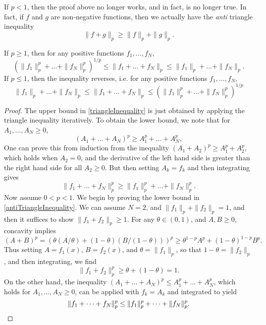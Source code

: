 \begin{remark}
  If $p < 1$, then the proof above no longer works, and in fact, is no longer true. In fact, if $f$ and $g$ are non-negative functions, then we actually have the \emph{anti} triangle inequality
  \[ \| f + g \|_p \geq \| f \|_p + \| g \|_p. \]
\end{remark}

\begin{theorem}
    If $p \geq 1$, then for any positive functions $f_1, \dots, f_N$,
    \begin{equation} \label{triangleInequality} ( \| f_1 \|_p^p + \dots + \| f_N \|_p^p )^{1/p} \leq \| f_1 + \dots + f_N \|_p \leq \| f_1 \|_p + \dots + \| f_N \|_p. \end{equation}
    If $p \leq 1$, then the inequality reverses, i.e. for any positive functions $f_1, \dots, f_N$,
    \begin{equation} \label{antiTriangleInequality} \| f_1 \|_p + \dots + \| f_N \|_p \leq \| f_1 + \dots + f_N \|_p \leq (\| f_1 \|_p^p + \dots + \| f_N \|_p^p)^{1/p} \end{equation}
\end{theorem}
\begin{proof}
    The upper bound in \ref{triangleInequality} is just obtained by applying the triangle inequality iteratively. To obtain the lower bound, we note that for $A_1, \dots, A_N \geq 0$,
    \[ (A_1 + \dots + A_N)^p \geq A_1^p + \dots + A_N^p, \]
    One can prove this from induction from the inequality $(A_1 + A_2)^p \geq A_1^p + A_2^p$, which holds when $A_2 = 0$, and the derivative of the left hand side is greater than the right hand side for all $A_2 \geq 0$. But then setting $A_k = f_k$ and then integrating gives
    \[ \| f_1 + \dots + f_N \|_p^p \geq \| f_1 \|_p^p + \dots + \| f_N \|_p^p. \]
    Now assume $0 < p < 1$. We begin by proving the lower bound in \ref{antiTriangleInequality}. We can assume $N = 2$, and $\| f_1 \|_p + \| f_2 \|_p = 1$, and then it suffices to show $\| f_1 + f_2 \|_p \geq 1$. For any $\theta \in (0,1)$, and $A,B \geq 0$, concavity implies
    \[ (A + B)^p = (\theta (A/\theta) + (1 - \theta) (B/(1-\theta)))^p \geq \theta^{1-p} A^p + (1 - \theta)^{1-p} B^p. \]
    Thus setting $A = f_1(x)$, $B = f_2(x)$, and $\theta = \| f_1 \|_p$, so that $1 - \theta = \| f_2 \|_p$, and then integrating, we find
    \[ \| f_1 + f_2 \|_p^p \geq \theta + (1 - \theta) = 1. \]
    On the other hand, the inequality $(A_1 + \dots + A_N)^p \leq A_1^p + \dots + A_N^p$, which holds for $A_1, \dots, A_N \geq 0$, can be applied with $f_k = A_k$ and integrated to yield
    \[ \| f_1 + \dots + f_N \|_p^p \leq \| f_1 \|_p^p + \dots + \| f_N \|_p^p. \qedhere \]
\end{proof}

